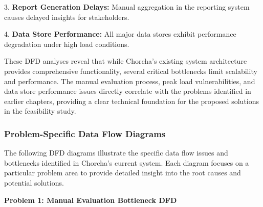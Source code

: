 \documentclass[12pt,a4paper,oneside]{book}
\begin{document}
\vspace{0.3cm}
3. \textbf{Report Generation Delays:} Manual aggregation in the reporting system causes delayed insights for stakeholders.

\vspace{0.3cm}
4. \textbf{Data Store Performance:} All major data stores exhibit performance degradation under high load conditions.

\vspace{0.5cm}
These DFD analyses reveal that while Chorcha's existing system architecture provides comprehensive functionality, several critical bottlenecks limit scalability and performance. The manual evaluation process, peak load vulnerabilities, and data store performance issues directly correlate with the problems identified in earlier chapters, providing a clear technical foundation for the proposed solutions in the feasibility study.

\vspace{0.5cm}
\newpage
\subsubsection{Problem-Specific Data Flow Diagrams}

The following DFD diagrams illustrate the specific data flow issues and bottlenecks identified in Chorcha's current system. Each diagram focuses on a particular problem area to provide detailed insight into the root causes and potential solutions.

\vspace{0.3cm}

\textbf{Problem 1: Manual Evaluation Bottleneck DFD}
\end{document}
